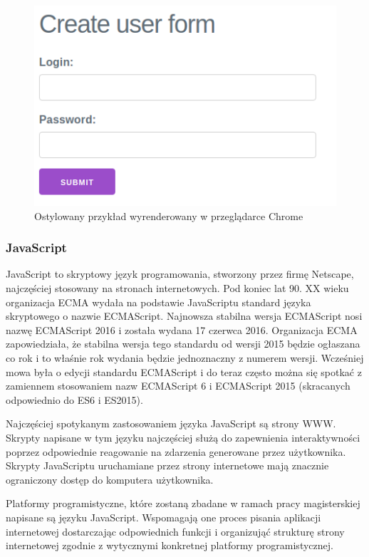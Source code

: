 \documentclass[polish, twoside, 12pt]{mwart}
\begin{document}
\begin{figure}[ht]
  \includegraphics[width=\textwidth]{html-css-chrome.png}
	\caption{Ostylowany przykład wyrenderowany w przeglądarce Chrome}
\end{figure}

\subsubsection{JavaScript}

JavaScript to skryptowy język programowania, stworzony przez firmę Netscape, najczęściej stosowany na stronach internetowych. Pod koniec lat 90. XX wieku organizacja ECMA wydała na podstawie JavaScriptu standard języka skryptowego o nazwie ECMAScript. Najnowsza stabilna wersja ECMAScript nosi nazwę ECMAScript 2016 \cite{es2016} i została wydana 17 czerwca 2016. Organizacja ECMA zapowiedziała, że stabilna wersja tego standardu od wersji 2015 będzie ogłaszana co rok i to właśnie rok wydania będzie jednoznaczny z numerem wersji. Wcześniej mowa była o edycji standardu ECMAScript i do teraz często można się spotkać z zamiennem stosowaniem nazw ECMAScript 6 i ECMAScript 2015 (skracanych odpowiednio do ES6 i ES2015).

Najczęściej spotykanym zastosowaniem języka JavaScript są strony WWW. Skrypty napisane w tym języku najczęściej służą do zapewnienia interaktywności poprzez odpowiednie reagowanie na zdarzenia generowane przez użytkownika. Skrypty JavaScriptu uruchamiane przez strony internetowe mają znacznie ograniczony dostęp do komputera użytkownika. 

Platformy programistyczne, które zostaną zbadane w ramach pracy magisterskiej napisane są języku JavaScript. Wspomagają one proces pisania aplikacji internetowej dostarczając odpowiednich funkcji i organizująć strukturę strony internetowej zgodnie z wytycznymi konkretnej platformy programistycznej.
\end{document}
